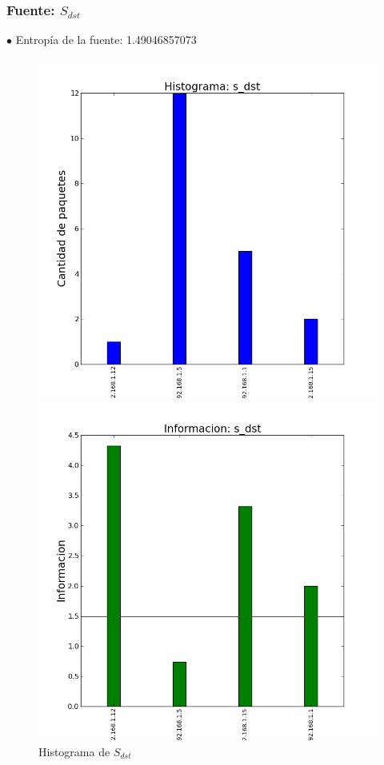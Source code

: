 \documentclass[10pt, a4paper]{article}
\begin{document}
\subsubsection{Fuente: $S_{dst}$}

$\bullet$ Entropía de la fuente: 1.49046857073

\begin{figure}[H]
  \begin{minipage}{0.5\linewidth}
    \includegraphics[width=\linewidth]{../imgs/pruebaFede-ips_s_dst_hist.png}
    \caption{Histograma de $S_{dst}$}\label{fig:Fede-dst-hist}
  \end{minipage}
\hfill
  \begin{minipage}{0.5\linewidth}
    \includegraphics[width=\linewidth]{../imgs/pruebaFede-ips_s_dst_info.png}

\end{minipage}
\end{figure}
\end{document}
